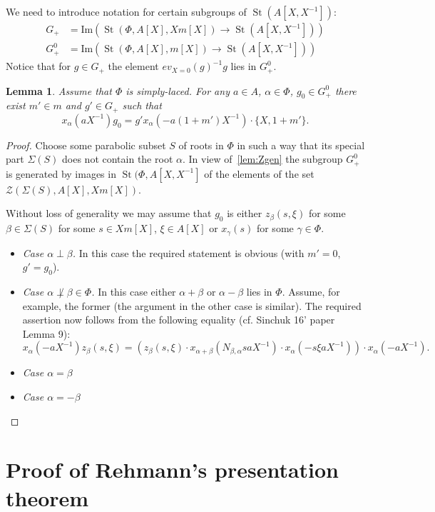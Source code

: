 \documentclass[oneside, 10pt]{amsart}
\newtheorem{lemma}{Lemma}
\theoremstyle{remark} %
\theoremstyle{definition}
\DeclareMathOperator{\St}{St}
\begin{document}
We need to introduce notation for certain subgroups of $\St(A[X, X^{-1}])$:
\begin{align}
 G_+   & = \mathrm{Im}(\St(\Phi, A[X], Xm[X]) \to \St(A[X, X^{-1}]))\\
 G_+^0 & = \mathrm{Im}(\St(\Phi, A[X], m[X]) \to \St(A[X, X^{-1}]))
\end{align}
Notice that for $ g\in G_+$ the element $ev_{X=0}(g)^{-1}g$ lies in $G_+^0$.
\begin{lemma} Assume that $\Phi$ is simply-laced.
 For any $a\in A$, $\alpha\in \Phi$, $g_0 \in G^0_+$ there exist $m'\in m$ and $g'\in G_+$ such that 
 \[x_{\alpha}(aX^{-1}) g_0  = g' x_\alpha(-a(1+m')X^{-1}) \cdot \{X, 1+m'\}.\]
\end{lemma}
\begin{proof}
 Choose some parabolic subset $S$ of roots in $\Phi$ in such a way that its special part $\Sigma(S)$ does not contain the root $\alpha$.
 In view of~\cref{lem:Zgen} the subgroup $G_+^0$ is generated by images in $\St(\Phi, A[X, X^{-1}]$ of the elements of the set $\mathcal{Z}(\Sigma(S), A[X], Xm[X])$.
 
 Without loss of generality we may assume that $g_0$ is either $z_\beta(s, \xi)$ for some $\beta\in \Sigma(S)$ for some $s\in Xm[X]$, $\xi\in A[X]$ or $x_\gamma(s)$ for some $\gamma \in \Phi$.
 \begin{itemize}
  \item {\it Case $\alpha \perp \beta$. } In this case the required statement is obvious (with $m'=0$, $g'=g_0$).
  \item {\it Case $\alpha \not \perp \beta \in \Phi$.} In this case either $\alpha + \beta$ or $\alpha - \beta$ lies in $\Phi$.
  Assume, for example, the former (the argument in the other case is similar).
  The required assertion now follows from the following equality (cf. Sinchuk 16' paper Lemma 9):
  \[ x_\alpha(-aX^{-1}) z_\beta(s, \xi) =  \left( z_\beta(s, \xi) \cdot x_{\alpha+\beta}(N_{\beta,\alpha}saX^{-1}) \cdot x_\alpha(-s\xi aX^{-1}) \right) \cdot x_\alpha(-aX^{-1}).\]
  \item {\it Case $\alpha = \beta$}
  \item {\it Case $\alpha = -\beta$}
 \end{itemize}

\end{proof}

\section{Proof of Rehmann's presentation theorem}

\printbibliography
\end{document}
